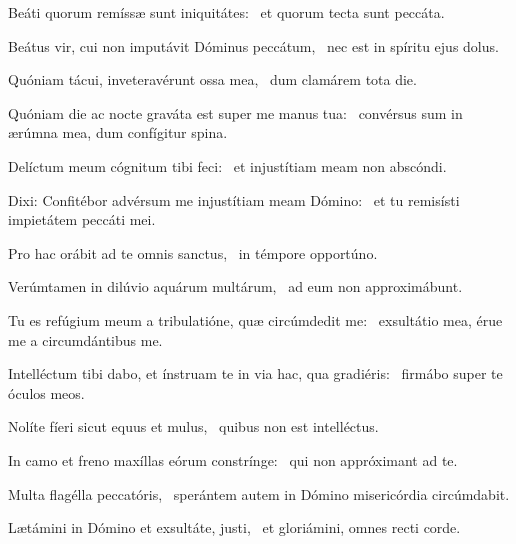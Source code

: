 \item Beáti quorum remíssæ sunt iniquitátes:~\psstar{} et quorum tecta sunt peccáta.

\item Beátus vir, cui non imputávit Dóminus peccátum,~\psstar{} nec est in spíritu ejus dolus.

\item Quóniam tácui, inveteravérunt ossa mea,~\psstar{} dum clamárem tota die.

\item Quóniam die ac nocte graváta est super me manus tua:~\psstar{} convérsus sum in ærúmna mea, dum confígitur spina.

\item Delíctum meum cógnitum tibi feci:~\psstar{} et injustítiam meam non abscóndi.

\item Dixi: Confitébor advérsum me injustítiam meam Dómino:~\psstar{} et tu remisísti impietátem peccáti mei.

\item Pro hac orábit ad te omnis sanctus,~\psstar{} in témpore opportúno.

\item Verúmtamen in dilúvio aquárum multárum,~\psstar{} ad eum non approximábunt.

\item Tu es refúgium meum a tribulatióne, quæ circúmdedit me:~\psstar{} exsultátio mea, érue me a circumdántibus me.

\item Intelléctum tibi dabo, et ínstruam te in via hac, qua gradiéris:~\psstar{} firmábo super te óculos meos.

\item Nolíte fíeri sicut equus et mulus,~\psstar{} quibus non est intelléctus.

\item In camo et freno maxíllas eórum constrínge:~\psstar{} qui non appróximant ad te.

\item Multa flagélla peccatóris,~\psstar{} sperántem autem in Dómino misericórdia circúmdabit.

\item Lætámini in Dómino et exsultáte, justi,~\psstar{} et gloriámini, omnes recti corde.
